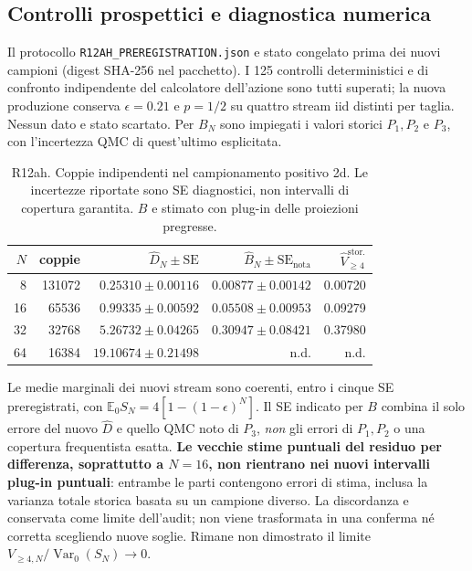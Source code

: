 \documentclass[11pt,a4paper]{article}
\begin{document}
\subsection{Controlli prospettici e diagnostica numerica}

Il protocollo \texttt{R12AH\_PREREGISTRATION.json} e stato congelato prima dei nuovi campioni (digest SHA-256 nel pacchetto). I 125 controlli deterministici e di confronto indipendente del calcolatore dell'azione sono tutti superati; la nuova produzione conserva $\epsilon=0.21$ e $p=1/2$ su quattro stream iid distinti per taglia. Nessun dato e stato scartato. Per $B_N$ sono impiegati i valori storici $P_1,P_2$ e $P_3$, con l'incertezza QMC di quest'ultimo esplicitata.

\begin{table}[htbp]
\centering\small
\caption{R12ah. Coppie indipendenti nel campionamento positivo 2d. Le incertezze riportate sono SE diagnostici, non intervalli di copertura garantita. $B$ e stimato con plug-in delle proiezioni pregresse.}
\label{tab:r12ah_samples}
\begin{tabular}{r r r r r}
\toprule
$N$ & coppie & $\widehat D_N\pm\mathrm{SE}$ & $\widehat B_N\pm\mathrm{SE}_{\mathrm{nota}}$ & $\widehat V_{\ge4}^{\mathrm{stor.}}$\\
\midrule
8 & 131072 & $0.25310\pm0.00116$ & $0.00877\pm0.00142$ & 0.00720\\
16 & 65536 & $0.99335\pm0.00592$ & $0.05508\pm0.00953$ & 0.09279\\
32 & 32768 & $5.26732\pm0.04265$ & $0.30947\pm0.08421$ & 0.37980\\
64 & 16384 & $19.10674\pm0.21498$ & n.d. & n.d.\\
\bottomrule
\end{tabular}
\end{table}

Le medie marginali dei nuovi stream sono coerenti, entro i cinque SE preregistrati, con $\mathbb E_0 S_N=4[1-(1-\epsilon)^N]$. Il SE indicato per $B$ combina il solo errore del nuovo $\widehat D$ e quello QMC noto di $P_3$, \emph{non} gli errori di $P_1,P_2$ o una copertura frequentista esatta. \textbf{Le vecchie stime puntuali del residuo per differenza, soprattutto a $N=16$, non rientrano nei nuovi intervalli plug-in puntuali}: entrambe le parti contengono errori di stima, inclusa la varianza totale storica basata su un campione diverso. La discordanza e conservata come limite dell'audit; non viene trasformata in una conferma né corretta scegliendo nuove soglie. Rimane non dimostrato il limite $V_{\ge4,N}/\operatorname{Var}_0(S_N)\to0$.
\end{document}
